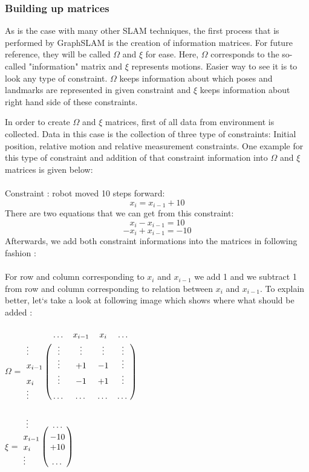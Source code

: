 \documentclass{ba-kecs}
\numberwithin{figure}{section}
\numberwithin{equation}{section}
\begin{document}
\subsubsection{Building up matrices}
As is the case with many other SLAM techniques, the first process that is performed by GraphSLAM is the creation of information matrices. For future reference, they will be called $\Omega$ and $\xi$ for ease. Here, $\Omega$ corresponds to the so-called "information" matrix and $\xi$ represents motions. Easier way to see it is to look any type of constraint. $\Omega$ keeps information about which poses and landmarks are represented in given constraint and $\xi$ keeps information about right hand side of these constraints.
	
In order to create $\Omega$ and $\xi$ matrices, first of all data from environment is collected. Data in this case is the collection of three type of constraints: Initial position, relative motion and relative measurement constraints. One example for this type of constraint and addition of that constraint information into $\Omega$ and $\xi$ matrices is given below:\\ \\
	Constraint : robot moved 10 steps forward: 
	\[ x_{i} = x_{i-1} + 10 \]
	There are two equations that we can get from this constraint:
	\[ x_{i} - x_{i-1} = 10 \]
	\[ -x_{i} + x_{i-1} = -10 \]
	Afterwards, we add both constraint informations into the matrices in following fashion :\\ \\
	For row and column corresponding to $x_{i}$ and $x_{i-1}$ we add 1 and we subtract 1 from row and column corresponding to relation between $x_{i}$ and $x_{i-1}$. To explain better, let`s take a look at following image which shows where what should be added :\\ \\
	$\Omega$ = $\bordermatrix{~ & \dots & x_{i-1} & x_{i} & \dots \cr
							\vdots & \vdots & \vdots & \vdots & \vdots \cr
                  			x_{i-1} & \vdots & +1 & -1 & \vdots \cr
                  			x_{i} & \vdots & -1 & +1 & \vdots \cr
                  			\vdots & \dots & \dots & \dots & \dots \cr}$ \\ \\
                  			
    $\xi$ = $\bordermatrix{~ \vdots & \dots \cr
                  			x_{i-1} & -10 \cr
                  			x_{i}  & +10 \cr
                  			\vdots & \dots \cr}$
                  
\end{document}
